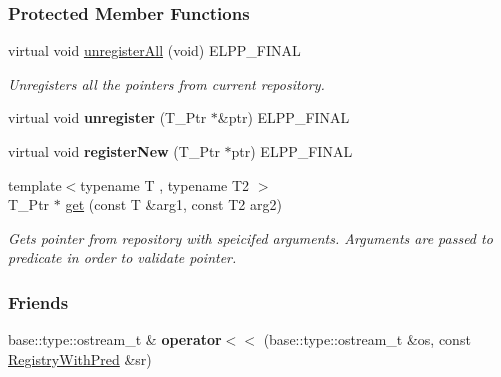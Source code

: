 \subsubsection*{Protected Member Functions}
\begin{DoxyCompactItemize}
\item 
\hypertarget{a00074_a66b4eca5bb71f3fa3f0737105a00890c}{}virtual void \hyperlink{a00074_a66b4eca5bb71f3fa3f0737105a00890c}{unregister\+All} (void) E\+L\+P\+P\+\_\+\+F\+I\+N\+A\+L\label{a00074_a66b4eca5bb71f3fa3f0737105a00890c}

\begin{DoxyCompactList}\small\item\em Unregisters all the pointers from current repository. \end{DoxyCompactList}\item 
\hypertarget{a00074_aaf1afb5a9f8bd1d99c46ac529ea16417}{}virtual void {\bfseries unregister} (T\+\_\+\+Ptr $\ast$\&ptr) E\+L\+P\+P\+\_\+\+F\+I\+N\+A\+L\label{a00074_aaf1afb5a9f8bd1d99c46ac529ea16417}

\item 
\hypertarget{a00074_a561a5d418106a16473ff94d43a4b6b04}{}virtual void {\bfseries register\+New} (T\+\_\+\+Ptr $\ast$ptr) E\+L\+P\+P\+\_\+\+F\+I\+N\+A\+L\label{a00074_a561a5d418106a16473ff94d43a4b6b04}

\item 
\hypertarget{a00074_a811d9cc011d945bc7237e6ae1cf2f096}{}{\footnotesize template$<$typename T , typename T2 $>$ }\\T\+\_\+\+Ptr $\ast$ \hyperlink{a00074_a811d9cc011d945bc7237e6ae1cf2f096}{get} (const T \&arg1, const T2 arg2)\label{a00074_a811d9cc011d945bc7237e6ae1cf2f096}

\begin{DoxyCompactList}\small\item\em Gets pointer from repository with speicifed arguments. Arguments are passed to predicate in order to validate pointer. \end{DoxyCompactList}\end{DoxyCompactItemize}
\subsubsection*{Friends}
\begin{DoxyCompactItemize}
\item 
\hypertarget{a00074_a71b45d148b62604847fe06f7addda779}{}base\+::type\+::ostream\+\_\+t \& {\bfseries operator$<$$<$} (base\+::type\+::ostream\+\_\+t \&os, const \hyperlink{a00074}{Registry\+With\+Pred} \&sr)\label{a00074_a71b45d148b62604847fe06f7addda779}

\end{DoxyCompactItemize}


